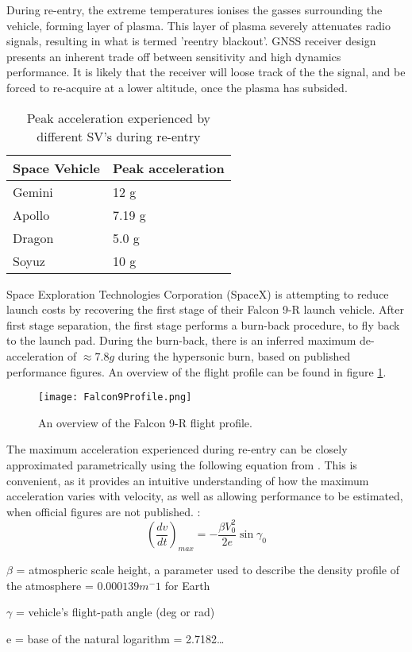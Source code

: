 During re-entry, the extreme temperatures ionises the gasses surrounding the vehicle, forming  layer of plasma. This layer of plasma severely attenuates radio signals, resulting in what is termed 'reentry blackout'. GNSS receiver design presents an inherent trade off between sensitivity and high dynamics performance. It is likely that the receiver will loose track of the the signal, and be forced to re-acquire at a lower altitude, once the plasma has subsided. 


\begin{table}[!htb]
\centering
\begin{tabular}{|l|l|}
\hline
Space Vehicle & Peak acceleration                      \\ \hline
Gemini        & 12 g \cite{FAA}                      \\ \hline
Apollo        & 7.19 g \cite{johnston1975biomedical} \\ \hline
Dragon        & 5.0 g \cite{trevino2008spacex}       \\ \hline
Soyuz         & 10 g \cite{ReentryDynamics}                   \\ \hline
\end{tabular}
\caption{Peak acceleration experienced by different \ac{SV}'s during re-entry}
\label{ReEntryTable}
\end{table}

Space Exploration Technologies Corporation (SpaceX) is attempting to reduce launch costs by recovering the first stage of their Falcon 9-R launch vehicle. After first stage separation, the first stage performs a burn-back procedure, to fly back to the launch pad. During the burn-back, there is an inferred maximum de-acceleration of $\approx 7.8 g$ during the hypersonic burn, based on published performance figures. An overview of the flight profile can be found in figure \ref{fig:Falcon9Profile}.

\begin{figure}[!htb] 
    \centering
    \texttt{[image: Falcon9Profile.png]} 
    \caption{An overview of the Falcon 9-R flight profile.}
    \label{fig:Falcon9Profile}
\end{figure}


The maximum acceleration experienced during re-entry can be closely approximated parametrically using the following equation from \cite{eastre}. This is convenient, as it provides an intuitive understanding of how the maximum acceleration varies with velocity, as well as allowing performance to be estimated, when official figures are not published. : 
$$(\frac{dv}{dt})_{max} = -\frac{\beta V_0 ^2}{2e} \sin \gamma_0$$

$\beta$ = atmospheric scale height, a parameter used to describe the density profile of the atmosphere = $0.000139 m^-1$ for Earth

$\gamma$ = vehicle's flight-path angle (deg or rad)

e = base of the natural logarithm = 2.7182\ldots

